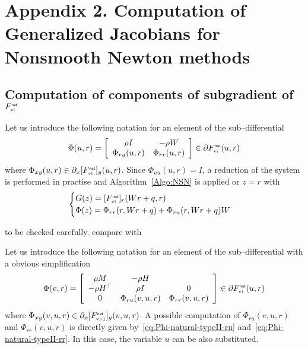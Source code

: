 \section*{Appendix 2. Computation of Generalized Jacobians for Nonsmooth Newton methods}

\subsection*{Computation of components of subgradient of $F_{{\hbox{\tiny{vi}}}}^{\hbox{\sf \tiny{nat}}}$}



 Let us introduce the following notation for an element of the sub--differential
\begin{equation}
  \label{eq:Phi-natural-typeII}
  \Phi(u, r)  = \left[
  \begin{array}{cc}
    \rho  I  &   - \rho W \\
     \Phi_{r u}(u,r) &   \Phi_{r r}(u,r)
  \end{array}\right] \in \partial F_{\vitwo}^\nat(u,r)
\end{equation}
where $ \Phi_{x y}(u,r) \in \partial_{x}[F_{{\hbox{\tiny{vi}}}}^{\hbox{\sf \tiny{nat}}}]_{y}(u,r)$. Since $\Phi_{u u}(u,r) = I $, a reduction of the system is performed in practise and Algorithm~\ref{Algo:NSN} is applied or $z =r$ with
\begin{equation}
  \label{eq:phiphi_ter}
  \begin{cases}
    G(z) = [F_{\vitwo}^\nat]_{r}(Wr+q,r) \\
    \Phi(z) = \Phi_{rr}(r,Wr+q) + \Phi_{ru}(r,Wr+q) W
  \end{cases}
\end{equation}
\begin{ndrva}
  to be checked carefully. compare with \cite{Hayashi.ea_SIOPT2005}
\end{ndrva}

 Let us introduce the following notation for an element of the sub--differential with a obvious simplification
\begin{equation}
  \label{eq:Phi-natural-typeI}
  \Phi(v,  r)  = \left[
  \begin{array}{ccc}
   \rho M &  - \rho H  \\
   -\rho H^\top &  \rho I &   0  \\
   0  &   \Phi_{r u}(v,u,r) &   \Phi_{r r}(v,u,r)
 \end{array}\right] \in \partial F_{\vitwo}^\nat(u,r)
\end{equation}
where $ \Phi_{x y}(v,u,r) \in \partial_{x}[F_{{\hbox{\tiny{vi-1}}}}^{\hbox{\sf \tiny{nat}}}]_{y}(v,u,r)$. A possible computation of  $\Phi_{r u}(v,u,r)$ and $\Phi_{r r}(v,u,r) $ is directly given by~\eqref{eq:Phi-natural-typeII-ru} and~\eqref{eq:Phi-natural-typeII-rr}. In this case, the variable $u$ can be also substituted.







